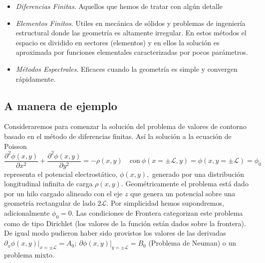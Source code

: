 \documentclass[spanish,titlepage,11pt]{article}
\begin{document}
\begin{itemize}
\item \textit{Diferencias Finitas}. Aquellos que hemos de tratar con alg\'{u}n detalle

\item \textit{Elementos Finitos}. Utiles en mec\'{a}nica de s\'{o}lidos y
problemas de ingenier\'{i}a estructural donde las geometr\'{i}a es altamente
irregular. En estos m\'{e}todos el espacio es dividido en sectores (elementos)
y en ellos la soluci\'{o}n es aproximada por funciones elementales
caracterizadas por pocos par\'{a}metros.

\item \textit{M\'{e}todos Espectrales}. Eficaces cuando la geometr\'{i}a es
simple y convergen r\'{a}pidamente.
\end{itemize}

\subsection{A manera de ejemplo}

Consideraremos para comenzar la soluci\'{o}n del problema de valores de
contorno basado en el m\'{e}todo de diferencias finitas. As\'{i} la
soluci\'{o}n a la ecuaci\'{o}n de Poisson
\[
\frac{\partial^{2}\phi\left(  x,y\right)  }{\partial x^{2}}+\frac{\partial
^{2}\phi\left(  x,y\right)  }{\partial y^{2}}=-\rho\left(  x,y\right)
\quad\mathrm{con}\ \phi\left(  x=\pm\mathcal{L},y\right)  =\phi\left(
x,y=\pm\mathcal{L}\right)  =\phi_{0}
\]
representa el potencial electrost\'{a}tico, $\phi\left(  x,y\right)  ,$
generado por una distribuci\'{o}n longitudinal infinita de carga $\rho\left(
x,y\right)  $. Geom\'{e}tricamente el problema est\'{a} dado por un hilo
cargado alineado con el eje $z$ que genera un potencial sobre una
geometr\'{i}a rectangular de lado $2\mathcal{L}.$ Por simplicidad hemos
supondremos, adicionalmente $\phi_{0}=0.$ Las condiciones de Frontera
categorizan este problema como de tipo Dirichlet (los valores de la
funci\'{o}n est\'{a}n dados sobre la frontera). De igual modo pudieron haber
sido provistos los valores de las derivadas $\left.  \partial_{x}\phi\left(
x,y\right)  \right|  _{x=\pm\mathcal{L}}=A_{0};\ \left.  \partial\phi\left(
x,y\right)  \right|  _{y=\pm\mathcal{L}}=B_{0}$ (Problema de Neuman) o un
problema mixto.
\end{document}
